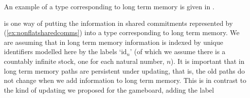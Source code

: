   
An example of a type corresponding to long term memory is given in
\nexteg{}.
\begin{ex} 
\label{ex:ltm} 
\end{ex} 
\preveg{} is one way of putting the information in shared commitments represented by
(\ref{ex:nonflatsharedcomms}) into a type corresponding to long term
memory.  We are assuming that in long term memory information is
indexed by unique identifiers modelled here by the labels `id$_n$' (of
which we assume there is a countably infinite stock, one for each
natural number, $n$).  It is important that in long term memory paths
are persistent under updating, that is, the old paths do not change
when we add information to long term memory.  This is in contrast to
the kind of updating we proposed for the gameboard, adding the label

